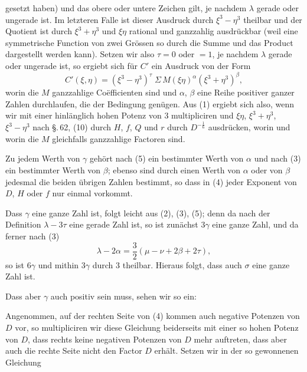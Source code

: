 gesetzt haben) und das obere oder untere Zeichen gilt, je nachdem
$\lambda$ gerade oder ungerade ist. Im letzteren Falle ist dieser
Ausdruck durch $\xi^3 - \eta^3$ theilbar und der Quotient ist durch
$\xi^3 + \eta^3$ und $\xi\eta$ rational und ganzzahlig ausdrückbar (weil eine
symmetrische Function von zwei Grössen so durch die Summe
und das Product dargestellt werden kann). Setzen wir also $\tau = 0$
oder $= 1$, je nachdem $\lambda$ gerade oder ungerade ist, so ergiebt
sich für $C'$ ein Ausdruck von der Form
\[
C'(\xi, \eta) = (\xi^3 - \eta^3)^\tau \; \Sigma \, M (\xi\eta)^\alpha (\xi^3 + \eta^3)^\beta,
\]
worin die $M$ ganzzahlige Coëfficienten sind und $\alpha$, $\beta$ eine Reihe
positiver ganzer Zahlen durchlaufen, die der Bedingung
genügen. Aus (1) ergiebt sich also, wenn wir mit einer hinlänglich hohen Potenz von 3 multipliciren und $\xi\eta$, $\xi^3+\eta^3$, $\xi^3-\eta^3$
nach \S.\,62, (10) durch $H$, $f$, $Q$ und $r$ durch $D^{-\frac{1}{6}}$ ausdrücken,
worin
und worin die $M$ gleichfalls ganzzahlige Factoren sind.

Zu jedem Werth von $\gamma$ gehört nach (5) ein bestimmter
Werth von $\alpha$ und nach (3) ein bestimmter Werth von $\beta$; ebenso
sind durch einen Werth von $\alpha$ oder von $\beta$ jedesmal die beiden
übrigen Zahlen bestimmt, so dass in (4) jeder Exponent von
$D$, $H$ oder $f$ nur einmal vorkommt.

Dass $\gamma$ eine ganze Zahl ist, folgt leicht aus (2), (3), (5);
denn da nach der Definition $\lambda - 3\tau$ eine gerade Zahl ist, so
ist zunächst $3\gamma$ eine ganze Zahl, und da ferner nach (3)
\[
\lambda - 2\alpha = \frac{3}{2}(\mu - \nu + 2\beta + 2\tau),
\]
so ist $6\gamma$ und mithin $3\gamma$ durch 3 theilbar. Hieraus folgt, dass
auch $\sigma$ eine ganze Zahl ist.

Dass aber $\gamma$ auch positiv sein muss, sehen wir so ein:

Angenommen, auf der rechten Seite von (4) kommen auch
negative Potenzen von $D$ vor, so multipliciren wir diese Gleichung
beiderseits mit einer so hohen Potenz von $D$, dass rechts keine
negativen Potenzen von $D$ mehr auftreten, dass aber auch die
rechte Seite nicht den Factor $D$ erhält. Setzen wir in der so
gewonnenen Gleichung
